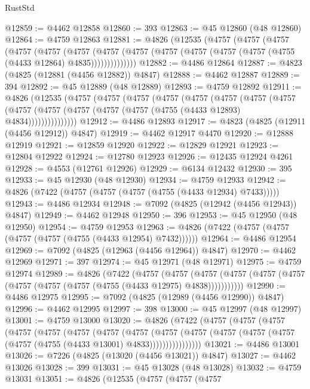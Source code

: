 \begin{lexlean}{RustStd}
\begin{coremodule}
@12859 := @4462 @12858
@12860 := 393
@12863 := @45 @12860 (@48 @12860)
@12864 := @4759 @12863
@12881 := @4826
    (@12535
      (@4757
        (@4757
          (@4757
            (@4757
              (@4757
                (@4757
                  (@4757
                    (@4757 (@4757 (@4757 (@4757 (@4757 (@4755 (@4433 @12864) @4835))))))))))))))
@12882 := @4486 @12864
@12887 := @4823 (@4825 (@12881 (@4456 @12882)) @4847)
@12888 := @4462 @12887
@12889 := 394
@12892 := @45 @12889 (@48 @12889)
@12893 := @4759 @12892
@12911 := @4826
    (@12535
      (@4757
        (@4757
          (@4757
            (@4757
              (@4757
                (@4757
                  (@4757
                    (@4757
                      (@4757 (@4757 (@4757 (@4757 (@4757 (@4755 (@4433 @12893) @4834)))))))))))))))
@12912 := @4486 @12893
@12917 := @4823 (@4825 (@12911 (@4456 @12912)) @4847)
@12919 := @4462 @12917 @4470
@12920 := @12888 @12919
@12921 := @12859 @12920
@12922 := @12829 @12921
@12923 := @12804 @12922
@12924 := @12780 @12923
@12926 := @12435 @12924 @4261
@12928 := @4553 (@12761 @12926)
@12929 := @6134 @12432
@12930 := 395
@12933 := @45 @12930 (@48 @12930)
@12934 := @4759 @12933
@12942 := @4826 (@7422 (@4757 (@4757 (@4757 (@4755 (@4433 @12934) @7433)))))
@12943 := @4486 @12934
@12948 := @7092 (@4825 (@12942 (@4456 @12943)) @4847)
@12949 := @4462 @12948
@12950 := 396
@12953 := @45 @12950 (@48 @12950)
@12954 := @4759 @12953
@12963 := @4826 (@7422 (@4757 (@4757 (@4757 (@4757 (@4755 (@4433 @12954) @7432))))))
@12964 := @4486 @12954
@12969 := @7092 (@4825 (@12963 (@4456 @12964)) @4847)
@12970 := @4462 @12969
@12971 := 397
@12974 := @45 @12971 (@48 @12971)
@12975 := @4759 @12974
@12989 := @4826
    (@7422
      (@4757
        (@4757
          (@4757 (@4757 (@4757 (@4757 (@4757 (@4757 (@4757 (@4755 (@4433 @12975) @4838)))))))))))
@12990 := @4486 @12975
@12995 := @7092 (@4825 (@12989 (@4456 @12990)) @4847)
@12996 := @4462 @12995
@12997 := 398
@13000 := @45 @12997 (@48 @12997)
@13001 := @4759 @13000
@13020 := @4826
    (@7422
      (@4757
        (@4757
          (@4757
            (@4757
              (@4757
                (@4757
                  (@4757
                    (@4757
                      (@4757
                        (@4757
                          (@4757 (@4757 (@4757 (@4757 (@4755 (@4433 @13001) @4833))))))))))))))))
@13021 := @4486 @13001
@13026 := @7226 (@4825 (@13020 (@4456 @13021)) @4847)
@13027 := @4462 @13026
@13028 := 399
@13031 := @45 @13028 (@48 @13028)
@13032 := @4759 @13031
@13051 := @4826
    (@12535
      (@4757
        (@4757
          (@4757

\end{coremodule}
\end{lexlean}
